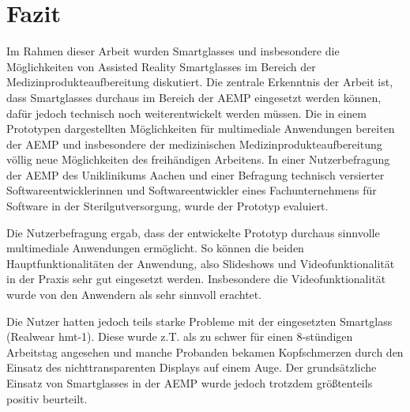 %
%
%
%
%
%
\chapter{Fazit}
\label{ch:Fazit}
Im Rahmen dieser Arbeit wurden Smartglasses und insbesondere die Möglichkeiten von Assisted Reality Smartglasses im Bereich der Medizinprodukteaufbereitung diskutiert. Die zentrale Erkenntnis der Arbeit ist, dass Smartglasses durchaus im Bereich der AEMP eingesetzt werden können, dafür jedoch technisch noch weiterentwickelt werden müssen. Die in einem Prototypen dargestellten Möglichkeiten für multimediale Anwendungen bereiten der AEMP und insbesondere der medizinischen Medizinprodukteaufbereitung völlig neue Möglichkeiten des freihändigen Arbeitens. In einer Nutzerbefragung der AEMP des Uniklinikums Aachen und einer Befragung technisch versierter  Softwareentwicklerinnen und Softwareentwickler eines Fachunternehmens für Software in der Sterilgutversorgung, wurde der Prototyp evaluiert.

Die Nutzerbefragung ergab, dass der entwickelte Prototyp durchaus sinnvolle multimediale Anwendungen ermöglicht. So können die beiden Hauptfunktionalitäten der Anwendung, also Slideshows und Videofunktionalität in der Praxis sehr gut eingesetzt werden. Insbesondere die Videofunktionalität wurde von den Anwendern als sehr sinnvoll erachtet. 

Die Nutzer hatten jedoch teils starke Probleme mit der eingesetzten Smartglass (Realwear hmt-1). Diese wurde z.T. als zu schwer für einen 8-stündigen Arbeitstag angesehen und manche Probanden bekamen Kopfschmerzen durch den Einsatz des nichttransparenten Displays auf einem Auge. Der grundsätzliche Einsatz von Smartglasses in der AEMP wurde jedoch trotzdem größtenteils positiv beurteilt.